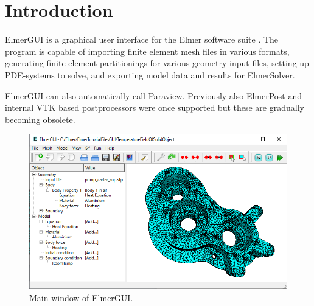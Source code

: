 

\chapter{Introduction}

ElmerGUI is a graphical user interface for the Elmer software suite
\cite{ElmerHome}. The program is capable of importing finite element mesh files in
various formats, generating finite element partitionings for various geometry
input files, setting up PDE-systems to solve, and exporting model data and results
for ElmerSolver.

ElmerGUI can also automatically call Paraview. Previously also ElmerPost and internal
VTK based postprocessors were once supported but these are gradually becoming obsolete.

\begin{figure}[htb]
\begin{center}
 \includegraphics[scale=0.6]{images/elmergui.png}
\caption{Main window of ElmerGUI.}
\end{center}
\end{figure}

